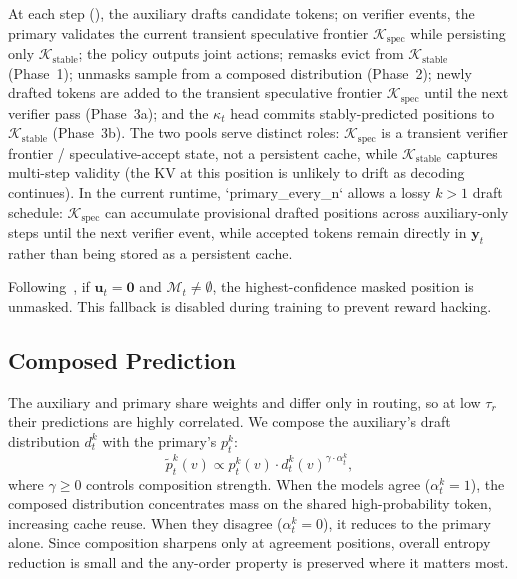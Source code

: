 \documentclass[11pt]{article}
\newcommand{\cM}{\mathcal{M}}
\newcommand{\cK}{\mathcal{K}}
\newcommand{\by}{\mathbf{y}}
\newcommand{\bu}{\mathbf{u}}
\begin{document}
At each step (), the auxiliary drafts candidate tokens; on verifier events, the primary validates the current transient speculative frontier $\cK_{\mathrm{spec}}$ while persisting only $\cK_{\mathrm{stable}}$; the policy outputs joint actions; remasks evict from $\cK_{\mathrm{stable}}$ (Phase~1); unmasks sample from a composed distribution (Phase~2); newly drafted tokens are added to the transient speculative frontier $\cK_{\mathrm{spec}}$ until the next verifier pass (Phase~3a); and the $\kappa_t$ head commits stably-predicted positions to $\cK_{\mathrm{stable}}$ (Phase~3b).
The two pools serve distinct roles: $\cK_{\mathrm{spec}}$ is a transient verifier frontier / speculative-accept state, not a persistent cache, while $\cK_{\mathrm{stable}}$ captures multi-step validity (the KV at this position is unlikely to drift as decoding continues).
In the current runtime, `primary_every_n` allows a lossy $k{>}1$ draft schedule: $\cK_{\mathrm{spec}}$ can accumulate provisional drafted positions across auxiliary-only steps until the next verifier event, while accepted tokens remain directly in $\by_t$ rather than being stored as a persistent cache.

Following~\cite{jazbec2025learning}, if $\bu_t = \mathbf{0}$ and $\cM_t \neq \emptyset$, the highest-confidence masked position is unmasked.
This fallback is disabled during training to prevent reward hacking.

\subsection{Composed Prediction}
\label{sec:composed}

The auxiliary and primary share weights and differ only in routing, so at low $\tau_r$ their predictions are highly correlated.
We compose the auxiliary's draft distribution $d_t^k$ with the primary's $p_t^k$:
\begin{equation}
    \tilde{p}_t^k(v) \propto p_t^k(v) \cdot d_t^k(v)^{\gamma \cdot \alpha_t^k},
    \label{eq:composed}
\end{equation}
where $\gamma \geq 0$ controls composition strength.
When the models agree ($\alpha_t^k = 1$), the composed distribution concentrates mass on the shared high-probability token, increasing cache reuse.
When they disagree ($\alpha_t^k = 0$), it reduces to the primary alone.
Since composition sharpens only at agreement positions, overall entropy reduction is small and the any-order property is preserved where it matters most.
\end{document}

